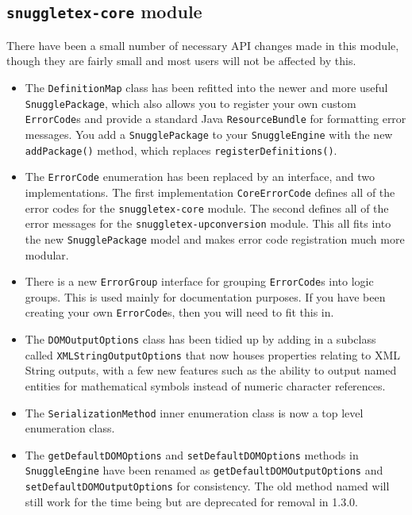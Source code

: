 
\subsection*{\verb|snuggletex-core| module}

There have been a small number of necessary API changes made in this module,
though they are fairly small and most users will not be affected by this.

\begin{itemize}

\item The \verb|DefinitionMap| class has been refitted into the newer and more useful
\verb|SnugglePackage|, which also allows you to register your own custom \verb|ErrorCode|s
and provide a standard Java \verb|ResourceBundle| for formatting error messages. You add
a \verb|SnugglePackage| to your \verb|SnuggleEngine| with the new \verb|addPackage()| method,
which replaces \verb|registerDefinitions()|.

\item The \verb|ErrorCode| enumeration has been replaced by an interface, and two
implementations. The first implementation \verb|CoreErrorCode| defines all of the error
codes for the \verb|snuggletex-core| module. The second defines all of the error messages
for the \verb|snuggletex-upconversion| module. This all fits into the new \verb|SnugglePackage|
model and makes error code registration much more modular.

\item There is a new \verb|ErrorGroup| interface for grouping \verb|ErrorCode|s into logic groups.
This is used mainly for documentation purposes. If you have been creating your own
\verb|ErrorCode|s, then you will need to fit this in.

\item The \verb|DOMOutputOptions| class has been tidied up by adding in a subclass called
\verb|XMLStringOutputOptions| that now houses properties relating to XML String outputs,
with a few new features such as the ability to output named entities for mathematical symbols
instead of numeric character references.

\item The \verb|SerializationMethod| inner enumeration class is now a top level enumeration
class.

\item The \verb|getDefaultDOMOptions| and \verb|setDefaultDOMOptions| methods in
\verb|SnuggleEngine| have been renamed as \verb|getDefaultDOMOutputOptions|
and \verb|setDefaultDOMOutputOptions| for consistency. The old method named will
still work for the time being but are deprecated for removal in 1.3.0.


\end{itemize}
